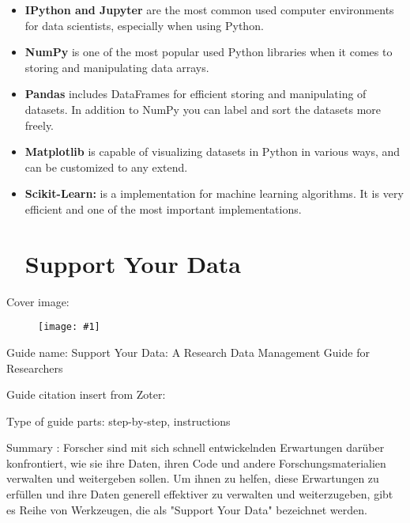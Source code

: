 \documentclass{article}
\newlength{\imgwidth}
\newcommand\scaledgraphics[2]{%
                
\settowidth{\imgwidth}{\texttt{[image: \#1]}}%
                
\setlength{\imgwidth}{\minof{\imgwidth}{#2\textwidth}}%
                
\texttt{[image: \#1]}%
                
}
\begin{document}
\begin{itemize}
\item \textbf{IPython and Jupyter} are the most common used computer environments for data scientists, especially when using Python.


\item \textbf{NumPy }is one of the most popular used Python libraries when it comes to storing and manipulating data arrays.


\item \textbf{Pandas }includes DataFrames for efficient storing and manipulating of datasets. In addition to NumPy you can label and sort the datasets more freely.


\item \textbf{Matplotlib }is capable of visualizing datasets in Python in various ways, and can be customized to any extend.


\item \textbf{Scikit-Learn: }is a implementation for machine learning algorithms. It is very efficient and one of the most important implementations.





\section{Support Your Data}\label{H2541051}



\end{itemize}

Cover image: 


\begin{center}
\begin{figure}
\scaledgraphics{45bdf5de-7e5b-448d-820a-d3b3288a4dbe.png}{0.5}
\label{F88206441}
\end{figure}


\end{center}


Guide name: Support Your Data: A Research Data Management Guide for Researchers


Guide citation insert from Zoter: \autocite{borghi_support_2018}


Type of guide parts: step-by-step, instructions


Summary : Forscher sind mit sich schnell entwickelnden Erwartungen darüber konfrontiert, wie sie ihre Daten, ihren Code und andere Forschungsmaterialien verwalten und weitergeben sollen. Um ihnen zu helfen, diese Erwartungen zu erfüllen und ihre Daten generell effektiver zu verwalten und weiterzugeben, gibt es Reihe von Werkzeugen, die als "Support Your Data" bezeichnet werden.
\end{document}
